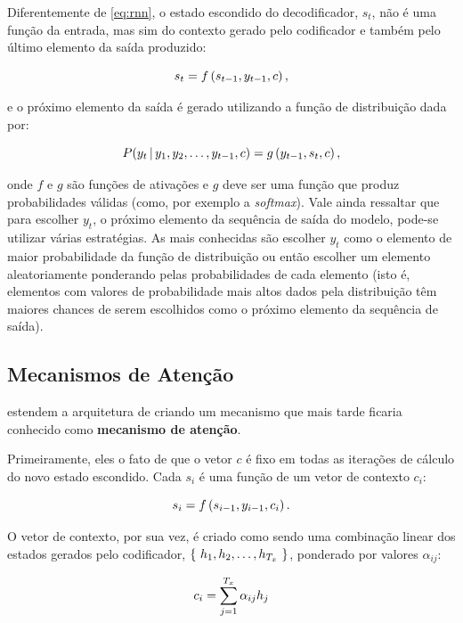 Diferentemente de \ref{eq:rnn}, o estado escondido do decodificador, $s_t$, não
é uma função da entrada, mas sim do contexto gerado pelo codificador e também
pelo último elemento da saída produzido:

\begin{equation}
s_t = f\paren{s_{t-1}, y_{t-1}, c},
\label{rnn-decoder}
\end{equation}

e o próximo elemento da saída é gerado utilizando a função de distribuição dada
por:

\begin{equation}
P(y_t\,|\,y_1, y_2,\dots, y_{t-1},c)=g\left( y_{t-1},s_t,c \right),
\end{equation}

onde $f$ e $g$ são funções de ativações e $g$ deve ser uma função que produz
probabilidades válidas (como, por exemplo a \textit{softmax}). Vale ainda
ressaltar que para escolher $y_t$, o próximo elemento da sequência de saída do
modelo, pode-se utilizar várias estratégias. As mais conhecidas são escolher
$y_t$ como o elemento de maior probabilidade da função de distribuição ou então
escolher um elemento aleatoriamente ponderando pelas probabilidades de cada
elemento (isto é, elementos com valores de probabilidade mais altos dados pela
distribuição têm maiores chances de serem escolhidos como o próximo elemento da
sequência de saída).

\subsection{Mecanismos de Atenção}%
\label{sub:mecanismos_de_atencao}

\cite{bahdanau-etal:2014:attention-mechanism} estendem a arquitetura de
\cite{cho-etal:2014:rnn-encoder-decoder} criando um mecanismo que mais tarde
ficaria conhecido como \textbf{mecanismo de atenção}.

Primeiramente, eles o fato de que o vetor $c$ é fixo em todas as iterações de
cálculo do novo estado escondido. Cada $s_i$ é uma função de um vetor de
contexto $c_i$:

\begin{equation}
  s_i=f\left( s_{i-1},y_{i-1},c_i \right).
\end{equation}

O vetor de contexto, por sua vez, é criado como sendo uma combinação linear dos
estados gerados pelo codificador, $\left\{ \ h_1, h_2,\dots, h_{T_x}\  \right\}$, ponderado por valores
$\alpha_{ij}$:

\begin{equation}
  c_i=\spsum{j=1}{T_x}\alpha_{ij}h_j
  \label{eq:attention}
\end{equation}

